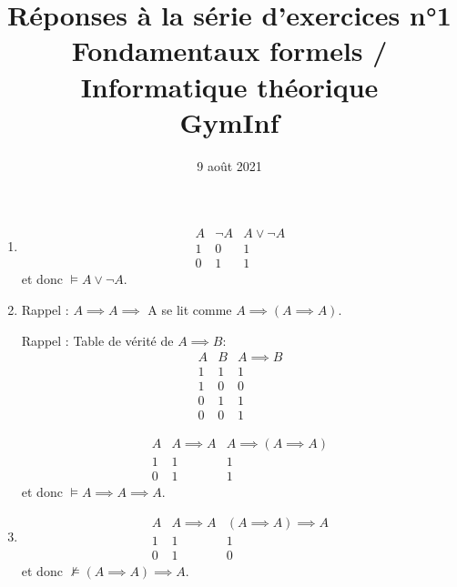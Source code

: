 \documentclass[12pt,french,a4paper]{article}
\begin{document}
\title{\vspace{-2cm}Réponses à la série d'exercices n°1\\\large{Fondamentaux formels / Informatique théorique\\GymInf}}
\date{\vspace{-1cm}9 août 2021}

\maketitle
\begin{question}
\begin{enumerate}

\item \begin{displaymath}
\begin{array}{c|ccc}
A  & \neg A & A \vee \neg A\\
\hline
1 & 0 & 1\\
0 & 1 & 1
\end{array} 
\end{displaymath}
et donc $\vDash A \vee \neg A.$

\item Rappel : $A \implies A \implies$ A se lit comme $A \implies (A \implies A).$

Rappel : Table de vérité de $A \implies B$:
\begin{displaymath}
\begin{array}{cc|c}
A & B & A \implies B\\
\hline
1 & 1 & 1\\
1 & 0 & 0\\
0 & 1 & 1\\
0 & 0 & 1
\end{array}
\end{displaymath}

\begin{displaymath}
\begin{array}{c|ccc}
A  & A \implies A & A \implies (A \implies A)\\
\hline
1 & 1 & 1\\
0 & 1 & 1
\end{array} 
\end{displaymath}
et donc $\vDash A \implies A \implies A.$

\item \begin{displaymath}
\begin{array}{c|ccc}
A  & A \implies A & (A \implies A) \implies A\\
\hline
1 & 1 & 1\\
0 & 1 & 0
\end{array} 
\end{displaymath}
et donc $\not\vDash (A \implies A) \implies A.$


\end{enumerate}
\end{question}
\end{document}
